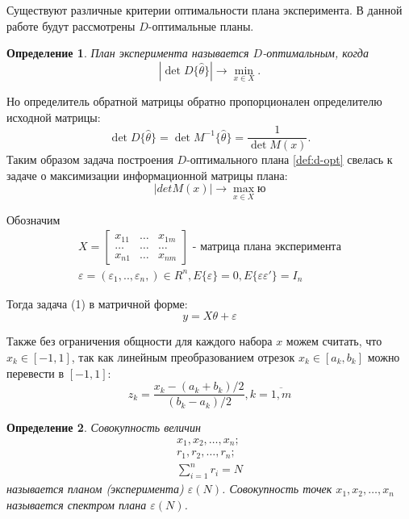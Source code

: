 Существуют различные критерии оптимальности плана эксперимента. В данной работе будут рассмотрены $D$-оптимальные планы.
\newtheorem{definition}{Определение}
\begin{definition}
	План эксперимента называется $D$-оптимальным, когда
	\begin{equation}\label{def:d-opt}
	|\det D\{\hat \theta\} | \rightarrow \min_{x \in X}.
	\end{equation}
\end{definition}

Но определитель обратной матрицы обратно пропорционален определителю исходной матрицы:
\begin{equation*}
\det {D\{\hat \theta\}} = \det {M^{-1}\{\hat \theta\}} = \frac 1 {\det M(x)}.
\end{equation*}
Таким образом задача построения $D$-оптимального плана \ref{def:d-opt} свелась к задаче о максимизации информационной матрицы плана:
\begin{equation}
|det M(x)| \rightarrow \max_{x \in X}ю
\end{equation}

Обозначим
\begin{gather}
X = 
\begin{bmatrix}
x_{11}	&	\dots	&	x_{1m}\\
\dots	&	\dots	&	\dots\\
x_{n1}	&	\dots	&	x_{nm}
\end{bmatrix} \text{ - матрица плана эксперимента} \\
\varepsilon = (\varepsilon_1,.., \varepsilon_n,) \in R^n, E\{\varepsilon\} = 0, E\{\varepsilon \varepsilon'\}=I_n
\end{gather}

Тогда задача (1) в матричной форме:
\begin{equation}
y = X \theta + \varepsilon
\end{equation}

Также без ограничения общности для каждого набора $x$ можем считать, что  $x_k \in [-1, 1]$, так как линейным преобразованием отрезок $x_k \in [a_k, b_k]$ можно перевести в $[-1, 1]$:
$$z_k = \frac{x_k - (a_k + b_k)/2}{(b_k - a_k)/2}, k = \overline{1, m}$$  

\begin{definition}
	Совокупность величин
	\begin{gather}
	x_1, x_2, \dots, x_n;\\
	r_1, r_2, \dots, r_n;\\
	\sum_{i=1}^n r_i = N
	\end{gather}
	называется планом (эксперимента) $\varepsilon(N)$. Совокупность точек  $x_1, x_2, \dots, x_n$ называется спектром плана $\varepsilon(N)$.
\end{definition}

